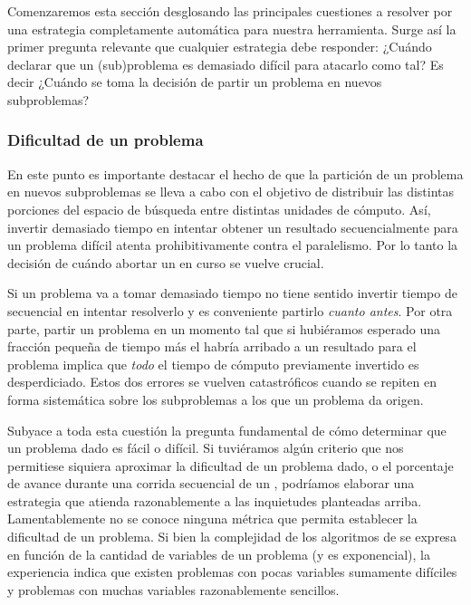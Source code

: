 

Comenzaremos esta sección desglosando las principales cuestiones a
resolver por una estrategia completamente automática para nuestra herramienta.
Surge así la primer pregunta relevante que cualquier estrategia debe
responder: ¿Cuándo declarar que un (sub)problema es demasiado difícil para
atacarlo como tal? Es decir ¿Cuándo se toma la decisión de partir un problema
en nuevos subproblemas?

\subsubsection{Dificultad de un problema}

En este punto es importante destacar el hecho de que la partición de un
problema en nuevos subproblemas se lleva a cabo con el objetivo de distribuir
las distintas porciones del espacio de búsqueda entre distintas unidades de
cómputo. Así, invertir demasiado tiempo en intentar obtener un resultado
secuencialmente para un problema difícil atenta prohibitivamente contra el
paralelismo. Por lo tanto la decisión de cuándo abortar un \solving en curso
se vuelve crucial.

Si un problema va a tomar demasiado tiempo no tiene sentido invertir tiempo de
\solving secuencial en intentar resolverlo y es conveniente partirlo
\emph{cuanto antes}. Por otra parte, partir un problema en un momento tal que
si hubiéramos esperado una fracción  pequeña de tiempo más el \w habría
arribado a un resultado para el problema implica que \emph{todo} el tiempo de
cómputo previamente invertido es desperdiciado. Estos dos errores se vuelven
catastróficos cuando se repiten en forma sistemática sobre los subproblemas a los que un problema da origen.

Subyace a toda esta cuestión la pregunta fundamental de cómo determinar que un
problema dado es fácil o difícil. Si tuviéramos algún criterio que nos
permitiese siquiera aproximar la dificultad de un problema dado, o el
porcentaje de avance durante una corrida secuencial de un \ssolver, podríamos
elaborar una estrategia que atienda razonablemente a las inquietudes
planteadas arriba. Lamentablemente no se conoce ninguna métrica que permita
establecer \apriori la dificultad de un problema. Si bien la complejidad de
los algoritmos de \ssolving se expresa en función de la cantidad de variables
de un problema (y es exponencial), la experiencia indica que existen problemas
con pocas variables sumamente difíciles y problemas con muchas variables
razonablemente sencillos.

